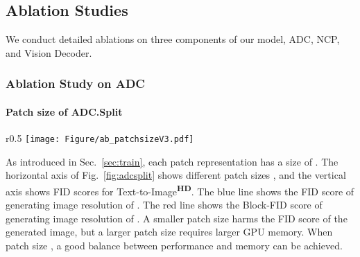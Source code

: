 \documentclass{article}
\begin{document}
\subsection{Ablation Studies}
\vspace{-2mm}
We conduct detailed ablations on three components of our model, ADC, NCP, and Vision Decoder. 

\subsubsection{Ablation Study on ADC}
\vspace{-2mm}
\paragraph{Patch size of ADC.Split}
\begin{wrapfigure}[11]{r}{0.5\textwidth}
\vspace{-0.17in}
    \centering
    \texttt{[image: Figure/ab\_patchsizeV3.pdf]}
    \vspace{-1.5em}
    \caption{Impact of patch size.}
    \label{fig:adcsplit}
\end{wrapfigure}
As introduced in Sec.~\ref{sec:train}, each patch representation has a size of . The horizontal axis of Fig.~\ref{fig:adcsplit} shows different patch sizes , and the vertical axis shows FID scores for Text-to-Image\textsuperscript{\textbf{HD}}. The blue line shows the FID score of generating image resolution of . The red line shows the Block-FID score of generating image resolution of . A smaller patch size harms the FID score of the generated image, but a larger patch size requires larger GPU memory. When patch size , a good balance between performance and memory can be achieved.
\end{document}
